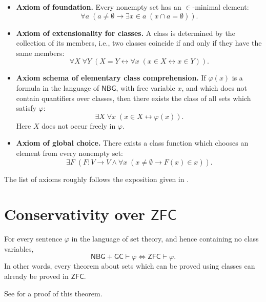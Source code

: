 \begin{itemize}
    \[\forall a\;\left(\emptyset\notin a \rightarrow \exists f\;(f : a \to \bigcup a\land\forall x\in a\;f(x)\in x)\right).\]
    \item[(\textnormal{NBG10})] \textbf{Axiom of foundation.}
    Every nonempty set has an $\in$-minimal element:
    \[\forall a\;\left(a\neq\emptyset \rightarrow \exists x\in a\;(x\cap a = \emptyset)\right).\]
    \item[(\textnormal{NBG11})] \textbf{Axiom of extensionality for classes.}
    A class is determined by the collection of its members, i.e., two classes coincide if and only if they have the same members:
    \[\forall X\;\forall Y\;\left(X = Y \leftrightarrow \forall x\;(x\in X \leftrightarrow x\in Y)\right).\]
    \item[(\textnormal{NBG12})] \textbf{Axiom schema of elementary class comprehension.}
    If $\varphi(x)$ is a formula in the language of $\mathsf{NBG}$, with free variable $x$, and which does not contain quantifiers over classes, then there exists the class of all sets which satisfy $\varphi$:
    \[\exists X\;\forall x\;\left(x\in X \leftrightarrow \varphi(x)\right).\]
    Here $X$ does not occur freely in $\varphi$.
    \item[(\textnormal{NBG13})] \textbf{Axiom of global choice.}
    There exists a class function which chooses an element from every nonempty set:
    \[\exists F\;\left(F : V \to V \land\forall x\;(x\neq\emptyset \rightarrow F(x)\in x)\right).\]
\end{itemize}

The list of axioms roughly follows the exposition given in \cite{Schindler2014}.

\section{Conservativity over \texorpdfstring{$\mathsf{ZFC}$}{ZFC}}

\begin{theorem}\label{thm:nbg-conservativity}
    For every sentence $\varphi$ in the language of set theory, and hence containing no class variables,
    \[\mathsf{NBG}+\mathsf{GC}\vdash\varphi \Longleftrightarrow \mathsf{ZFC}\vdash\varphi.\]
    In other words, every theorem about sets which can be proved using classes can already be proved in $\mathsf{ZFC}$.
\end{theorem}

See \cite{Felgner1971} for a proof of this theorem.

